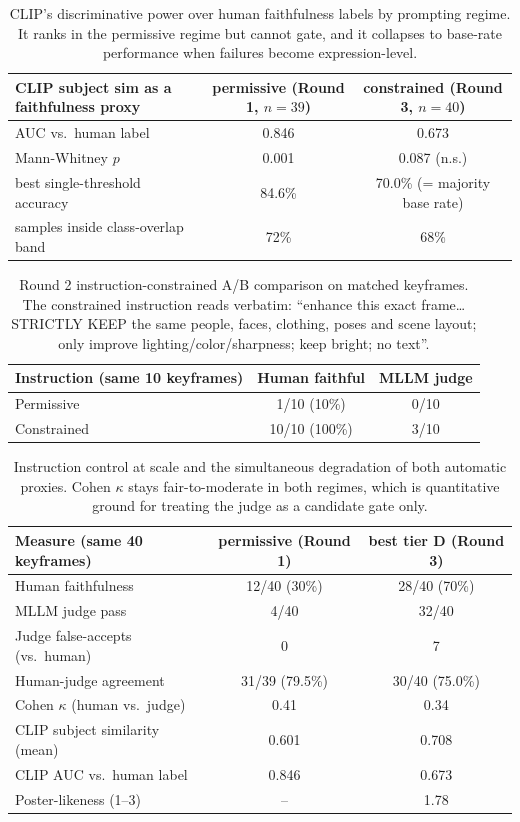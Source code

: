 \documentclass[10pt]{article}
\begin{document}
\begin{table}[htbp]
\centering
\small
\begin{tabular}{lcc}
\toprule
CLIP subject sim as a faithfulness proxy & permissive (Round 1, $n=39$) & constrained (Round 3, $n=40$) \\
\midrule
AUC vs.\ human label & 0.846 & 0.673 \\
Mann-Whitney $p$ & 0.001 & 0.087 (n.s.) \\
best single-threshold accuracy & 84.6\% & 70.0\% (= majority base rate) \\
samples inside class-overlap band & 72\% & 68\% \\
\bottomrule
\end{tabular}
\caption{CLIP's discriminative power over human faithfulness labels by prompting regime. It ranks in the permissive regime but cannot gate, and it collapses to base-rate performance when failures become expression-level.}
\label{tab:clipregime}
\end{table}

\begin{table}[htbp]
\centering
\small
\begin{tabular}{lcc}
\toprule
Instruction (same 10 keyframes) & Human faithful & MLLM judge \\
\midrule
Permissive & 1/10 (10\%) & 0/10 \\
Constrained & 10/10 (100\%) & 3/10 \\
\bottomrule
\end{tabular}
\caption{Round 2 instruction-constrained A/B comparison on matched keyframes. The constrained instruction reads verbatim: ``enhance this exact frame\ldots{} STRICTLY KEEP the same people, faces, clothing, poses and scene layout; only improve lighting/color/sharpness; keep bright; no text''.}
\label{tab:ab10}
\end{table}

\begin{table}[htbp]
\centering
\small
\begin{tabular}{lcc}
\toprule
Measure (same 40 keyframes) & permissive (Round 1) & best tier D (Round 3) \\
\midrule
Human faithfulness & 12/40 (30\%) & 28/40 (70\%) \\
MLLM judge pass & 4/40 & 32/40 \\
Judge false-accepts (vs.\ human) & 0 & 7 \\
Human-judge agreement & 31/39 (79.5\%) & 30/40 (75.0\%) \\
Cohen $\kappa$ (human vs.\ judge) & 0.41 & 0.34 \\
CLIP subject similarity (mean) & 0.601 & 0.708 \\
CLIP AUC vs.\ human label & 0.846 & 0.673 \\
Poster-likeness (1--3) & -- & 1.78 \\
\bottomrule
\end{tabular}
\caption{Instruction control at scale and the simultaneous degradation of both automatic proxies. Cohen $\kappa$ stays fair-to-moderate in both regimes, which is quantitative ground for treating the judge as a candidate gate only.}
\label{tab:rounds}
\end{table}
\end{document}
